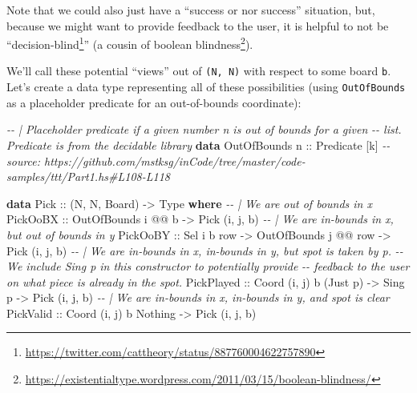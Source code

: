 \documentclass[]{article}
\newenvironment{Shaded}{}{}
\newcommand{\CommentTok}[1]{\textcolor[rgb]{0.38,0.63,0.69}{\textit{#1}}}
\newcommand{\DataTypeTok}[1]{\textcolor[rgb]{0.56,0.13,0.00}{#1}}
\newcommand{\KeywordTok}[1]{\textcolor[rgb]{0.00,0.44,0.13}{\textbf{#1}}}
\newcommand{\NormalTok}[1]{#1}
\newcommand{\OperatorTok}[1]{\textcolor[rgb]{0.40,0.40,0.40}{#1}}
\newcommand{\OtherTok}[1]{\textcolor[rgb]{0.00,0.44,0.13}{#1}}
\renewcommand{\href}[2]{#2\footnote{\url{#1}}}
\begin{document}
Note that we could also just have a ``success or nor success'' situation, but,
because we might want to provide feedback to the user, it is helpful to not be
``\href{https://twitter.com/cattheory/status/887760004622757890}{decision-blind}''
(a cousin of
\href{https://existentialtype.wordpress.com/2011/03/15/boolean-blindness/}{boolean
blindness}).

We'll call these potential ``views'' out of \texttt{(N,\ N)} with respect to
some board \texttt{b}. Let's create a data type representing all of these
possibilities (using \texttt{OutOfBounds} as a placeholder predicate for an
out-of-bounds coordinate):

\begin{Shaded}
\begin{Highlighting}[]
\CommentTok{{-}{-} | Placeholder predicate if a given number \textasciigrave{}n\textasciigrave{} is out of bounds for a given}
\CommentTok{{-}{-} list.  Predicate is from the \textquotesingle{}decidable\textquotesingle{} library}
\KeywordTok{data} \DataTypeTok{OutOfBounds}\OtherTok{ n ::} \DataTypeTok{Predicate}\NormalTok{ [k]}
\CommentTok{{-}{-} source: https://github.com/mstksg/inCode/tree/master/code{-}samples/ttt/Part1.hs\#L108{-}L118}

\KeywordTok{data} \DataTypeTok{Pick}\OtherTok{ ::}\NormalTok{ (}\DataTypeTok{N}\NormalTok{, }\DataTypeTok{N}\NormalTok{, }\DataTypeTok{Board}\NormalTok{) }\OtherTok{{-}\textgreater{}} \DataTypeTok{Type} \KeywordTok{where}
    \CommentTok{{-}{-} | We are out of bounds in x}
    \DataTypeTok{PickOoBX}\OtherTok{   ::} \DataTypeTok{OutOfBounds}\NormalTok{ i }\OperatorTok{@@}\NormalTok{ b                         }\OtherTok{{-}\textgreater{}} \DataTypeTok{Pick}\NormalTok{ \textquotesingle{}(i, j, b)}
    \CommentTok{{-}{-} | We are in{-}bounds in x, but out of bounds in y}
    \DataTypeTok{PickOoBY}\OtherTok{   ::} \DataTypeTok{Sel}\NormalTok{ i b row        }\OtherTok{{-}\textgreater{}} \DataTypeTok{OutOfBounds}\NormalTok{ j }\OperatorTok{@@}\NormalTok{ row }\OtherTok{{-}\textgreater{}} \DataTypeTok{Pick}\NormalTok{ \textquotesingle{}(i, j, b)}
    \CommentTok{{-}{-} | We are in{-}bounds in x, in{-}bounds in y, but spot is taken by \textasciigrave{}p\textasciigrave{}.}
    \CommentTok{{-}{-} We include \textasciigrave{}Sing p\textasciigrave{} in this constructor to potentially provide}
    \CommentTok{{-}{-} feedback to the user on what piece is already in the spot.}
    \DataTypeTok{PickPlayed}\OtherTok{ ::} \DataTypeTok{Coord}\NormalTok{ \textquotesingle{}(i, j) b (}\DataTypeTok{\textquotesingle{}Just}\NormalTok{ p) }\OtherTok{{-}\textgreater{}} \DataTypeTok{Sing}\NormalTok{ p        }\OtherTok{{-}\textgreater{}} \DataTypeTok{Pick}\NormalTok{ \textquotesingle{}(i, j, b)}
    \CommentTok{{-}{-} | We are in{-}bounds in x, in{-}bounds in y, and spot is clear}
    \DataTypeTok{PickValid}\OtherTok{  ::} \DataTypeTok{Coord}\NormalTok{ \textquotesingle{}(i, j) b }\DataTypeTok{\textquotesingle{}Nothing}                   \OtherTok{{-}\textgreater{}} \DataTypeTok{Pick}\NormalTok{ \textquotesingle{}(i, j, b)}
\end{Highlighting}
\end{Shaded}
\end{document}
